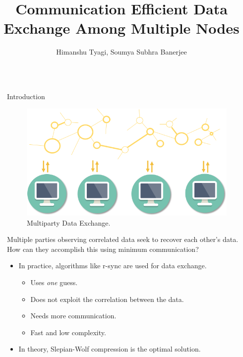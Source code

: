 \documentclass[final,hyperref={pdfpagelabels=false}]{beamer}
\title{\huge Communication Efficient Data Exchange Among Multiple Nodes} %
\author{Himanshu Tyagi, Soumya Subhra Banerjee} %
\institute{Indian Institute of Science} %
\begin{document}

\begin{frame}[t] %

\begin{columns}[t] %

\begin{column}{.02\textwidth}\end{column} %

\begin{column}{.465\textwidth} %


            
\begin{block}{Introduction}
\begin{figure}
\includegraphics[width=0.8\linewidth]{multiparty.png}
\caption{Multiparty Data Exchange.}
\end{figure}
Multiple parties observing correlated data seek to recover each other's data. How can they accomplish this using minimum communication?
\begin{itemize}
\item In practice, algorithms like r-sync are used for data exchange.
\begin{itemize}
\item Uses \emph{one} guess.
\item Does not exploit the correlation between the data.
\item Needs more communication.
\item Fast and low complexity.
\end{itemize}
\item In theory, Slepian-Wolf compression is the optimal solution.
\end{itemize}


\end{block}
\end{column}
\end{columns}
\end{frame}
\end{document}

